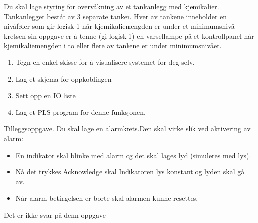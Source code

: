 


Du skal lage styring for overvåkning av et
tankanlegg med kjemikalier. Tankanlegget består av 3 separate tanker.
Hver av tankene inneholder en nivåføler som gir logisk 1 når kjemikaliemengden
er under et minimumsnivå kretsen sin oppgave er å tenne (gi logisk
1) en varsellampe på et kontrollpanel når kjemikaliemengden i to eller
flere av tankene er under minimumsnivået.
\begin{enumerate}
\item Tegn en enkel skisse for å visualisere systemet for deg selv. 
\item Lag et skjema for oppkoblingen
\item Sett opp en IO liste
\item Lag et PLS program for denne funksjonen.
\end{enumerate}

Tilleggsoppgave. Du skal lage en alarmkrets.Den skal virke slik ved aktivering av alarm:
\begin{itemize}
\item En indikator skal blinke med alarm og det skal lages lyd (simuleres
med lys). 
\item Nå det trykkes Acknowledge skal Indikatoren lys konstant og lyden
skal gå av. 
\item Når alarm betingelsen er borte skal alarmen kunne resettes. 
\end{itemize}
\vskip 10pt





Det er ikke svar på denn oppgave












